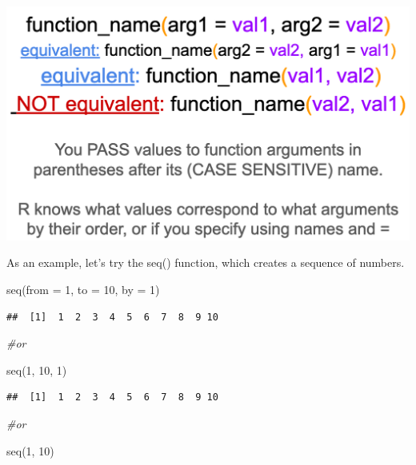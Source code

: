 \documentclass[
]{book}
\newenvironment{Shaded}{\begin{snugshade}}{\end{snugshade}}
\newcommand{\AttributeTok}[1]{\textcolor[rgb]{0.77,0.63,0.00}{#1}}
\newcommand{\CommentTok}[1]{\textcolor[rgb]{0.56,0.35,0.01}{\textit{#1}}}
\newcommand{\DecValTok}[1]{\textcolor[rgb]{0.00,0.00,0.81}{#1}}
\newcommand{\FunctionTok}[1]{\textcolor[rgb]{0.00,0.00,0.00}{#1}}
\newcommand{\NormalTok}[1]{#1}
\begin{document}
\includegraphics{images/Function syntax.png}

As an example, let's try the seq() function, which creates a sequence of numbers.

\begin{Shaded}
\begin{Highlighting}[]
\FunctionTok{seq}\NormalTok{(}\AttributeTok{from =} \DecValTok{1}\NormalTok{, }\AttributeTok{to =} \DecValTok{10}\NormalTok{, }\AttributeTok{by =} \DecValTok{1}\NormalTok{)}
\end{Highlighting}
\end{Shaded}

\begin{verbatim}
##  [1]  1  2  3  4  5  6  7  8  9 10
\end{verbatim}

\begin{Shaded}
\begin{Highlighting}[]
\CommentTok{\#or}

\FunctionTok{seq}\NormalTok{(}\DecValTok{1}\NormalTok{, }\DecValTok{10}\NormalTok{, }\DecValTok{1}\NormalTok{)}
\end{Highlighting}
\end{Shaded}

\begin{verbatim}
##  [1]  1  2  3  4  5  6  7  8  9 10
\end{verbatim}

\begin{Shaded}
\begin{Highlighting}[]
\CommentTok{\#or}

\FunctionTok{seq}\NormalTok{(}\DecValTok{1}\NormalTok{, }\DecValTok{10}\NormalTok{)}
\end{Highlighting}
\end{Shaded}
\end{document}
